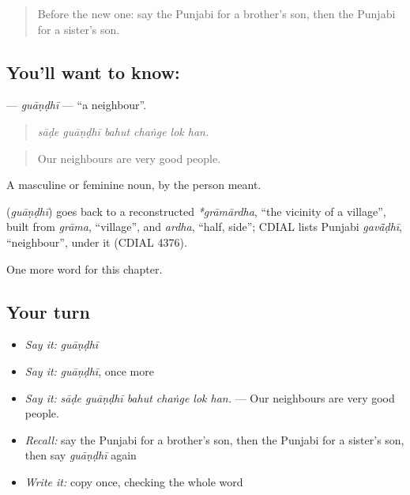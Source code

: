 \label{lesson:PA-C332-guandhi}



\begin{quote}
Before the new one: say the Punjabi for a brother's son, then the Punjabi for a sister's son.
\end{quote}

\subsection*{You'll want to know: }
\textbf{} — \emph{guāṇḍhī} — \textquotedblleft{}a neighbour\textquotedblright{}.

\begin{quote}
     
\end{quote}

\begin{quote}
\emph{sāḍe guāṇḍhī bahut chaṅge lok han.}
\end{quote}

\begin{quote}
Our neighbours are very good people.
\end{quote}

A masculine or feminine noun, by the person meant.

\begin{cousinweb}
\textbf{} (\emph{guāṇḍhī}) goes back to a reconstructed \emph{*grāmārdha}, \textquotedblleft{}the vicinity of a village\textquotedblright{}, built from \emph{grāma}, \textquotedblleft{}village\textquotedblright{}, and \emph{ardha}, \textquotedblleft{}half, side\textquotedblright{}; CDIAL lists Punjabi \emph{gavā̃ḍhī}, \textquotedblleft{}neighbour\textquotedblright{}, under it (CDIAL 4376).
\end{cousinweb}

\begin{grammarlens}[title={What you've built}]
One more word for this chapter.
\end{grammarlens}

\subsection*{Your turn}
\begin{itemize}
\raggedright
  \item \emph{Say it:} \emph{guāṇḍhī}
  \item \emph{Say it:} \emph{guāṇḍhī}, once more
  \item \emph{Say it:} \emph{sāḍe guāṇḍhī bahut chaṅge lok han.} — Our neighbours are very good people.
  \item \emph{Recall:} say the Punjabi for a brother's son, then the Punjabi for a sister's son, then say \emph{guāṇḍhī} again
  \item \emph{Write it:} copy \textbf{} once, checking the whole word
\end{itemize}

